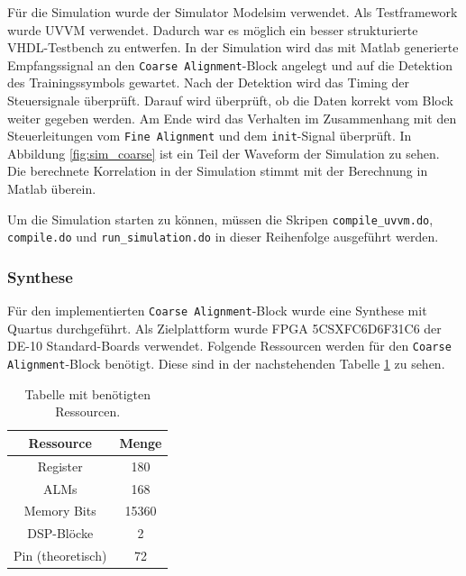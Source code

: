 Für die Simulation wurde der Simulator Modelsim verwendet. Als Testframework wurde UVVM verwendet. Dadurch war es möglich ein besser strukturierte VHDL-Testbench zu entwerfen. In der Simulation wird das mit Matlab generierte Empfangssignal an den \texttt{Coarse Alignment}-Block angelegt und auf die Detektion des Trainingssymbols gewartet. Nach der Detektion wird das Timing der Steuersignale überprüft. Darauf wird überprüft, ob die Daten korrekt vom Block weiter gegeben werden. Am Ende wird das Verhalten im Zusammenhang mit den Steuerleitungen vom \texttt{Fine Alignment} und dem \texttt{init}-Signal überprüft. In Abbildung \ref{fig:sim_coarse} ist ein Teil der Waveform der Simulation zu sehen. Die berechnete Korrelation in der Simulation stimmt mit der Berechnung in Matlab überein.

\begin{center}
\end{center}

Um die Simulation starten zu können, müssen die Skripen \texttt{compile\_uvvm.do}, \texttt{compile.do} und \texttt{run\_simulation.do} in dieser Reihenfolge ausgeführt werden.

\subsubsection{Synthese}
Für den implementierten \texttt{Coarse Alignment}-Block wurde eine Synthese mit Quartus durchgeführt. Als Zielplattform wurde FPGA 5CSXFC6D6F31C6 der DE-10 Standard-Boards verwendet. Folgende Ressourcen werden für den \texttt{Coarse Alignment}-Block benötigt.
Diese sind in der nachstehenden Tabelle \ref{tab:resources_coarse} zu sehen.

\begin{table}[H]
\centering
\begin{tabular}{|c|c|}
\hline
\textbf{Ressource} & \textbf{Menge} \\ \hline
Register & 180 \\ \hline
ALMs & 168 \\ \hline
Memory Bits & 15360 \\ \hline
DSP-Blöcke & 2 \\ \hline
Pin (theoretisch) & 72 \\ \hline
\end{tabular}
\caption{Tabelle mit benötigten Ressourcen.}
\label{tab:resources_coarse}
\end{table}

